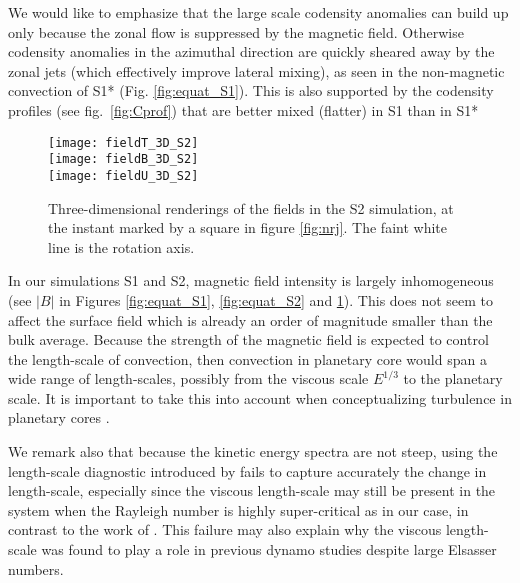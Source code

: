 \documentclass[12pt, a4paper]{article}
\begin{document}
We would like to emphasize that the large scale codensity anomalies can build up only because the zonal flow is suppressed by the magnetic field.
Otherwise codensity anomalies in the azimuthal direction are quickly sheared away by the zonal jets (which effectively improve lateral mixing), as seen in the non-magnetic convection of S1* (Fig. \ref{fig:equat_S1}).
This is also supported by the codensity profiles (see fig.~\ref{fig:Cprof}) that are better mixed (flatter) in S1 than in S1*

\begin{figure}
\texttt{[image: fieldT\_3D\_S2]} \\
\texttt{[image: fieldB\_3D\_S2]} \\
\texttt{[image: fieldU\_3D\_S2]}
\caption{Three-dimensional renderings of the fields in the S2 simulation, at the instant marked by a square in figure \ref{fig:nrj}.
The faint white line is the rotation axis.
}
\label{fig:3D}
\end{figure}

In our simulations S1 and S2, magnetic field intensity is largely inhomogeneous (see $|B|$ in Figures \ref{fig:equat_S1}, \ref{fig:equat_S2} and \ref{fig:3D}).
This does not seem to affect the surface field which is already an order of magnitude smaller than the bulk average.
Because the strength of the magnetic field is expected to control the length-scale of convection, then convection in planetary core would span a wide range of length-scales, possibly from the viscous scale $E^{1/3}$ to the planetary scale.
It is important to take this into account when conceptualizing turbulence in planetary cores \citep[e.g.][]{nataf2015}.

We remark also that because the kinetic energy spectra are not steep, using the length-scale diagnostic introduced by \citet[and widely used afterwards]{christensen2006}  fails to capture accurately the change in length-scale, especially since the viscous length-scale may still be present in the system when the Rayleigh number is highly super-critical as in our case, in contrast to the work of \citet{matsui2014}.
This failure may also explain why the viscous length-scale was found to play a role in previous dynamo studies \citep{king2013} despite large Elsasser numbers.
\end{document}
